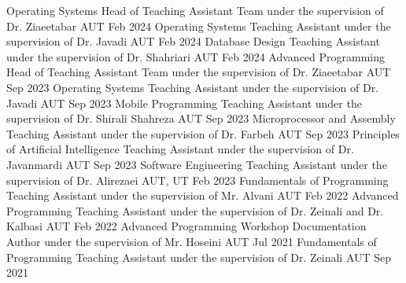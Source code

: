 \documentclass[]{awesome-cv}
\begin{document}
\begin{cvhonors}
        \cvhonor
	{Operating Systems}
	{Head of Teaching Assistant Team under the supervision of Dr. Ziaeetabar}
	{AUT}
	{Feb 2024}
         \cvhonor
	{Operating Systems}
	{Teaching Assistant under the supervision of Dr. Javadi}
	{AUT}
	{Feb 2024}
         \cvhonor
	{Database Design}
	{Teaching Assistant under the supervision of Dr. Shahriari}
	{AUT}
	{Feb 2024}
	\cvhonor
	{Advanced Programming}
	{Head of Teaching Assistant Team under the supervision of Dr. Ziaeetabar}
	{AUT}
	{Sep 2023}
	\cvhonor
	{Operating Systems}
	{Teaching Assistant under the supervision of Dr. Javadi}
	{AUT}
	{Sep 2023}
	\cvhonor
	{Mobile Programming}
	{Teaching Assistant under the supervision of Dr. Shirali Shahreza}
	{AUT}
	{Sep 2023}
	\cvhonor
	{Microprocessor and Assembly}
	{Teaching Assistant under the supervision of Dr. Farbeh}
	{AUT}
	{Sep 2023}
	\cvhonor
	{Principles of Artificial Intelligence}
	{Teaching Assistant under the supervision of Dr. Javanmardi}
	{AUT}
	{Sep 2023}
	\cvhonor
	{Software Engineering}
	{Teaching Assistant under the supervision of Dr. Alirezaei}
	{AUT, UT}
	{Feb 2023}
	\cvhonor
	{Fundamentals of Programming}
	{Teaching Assistant under the supervision of Mr. Alvani}
	{AUT}
	{Feb 2022}
	\cvhonor
	{Advanced Programming}
	{Teaching Assistant under the supervision of Dr. Zeinali and Dr. Kalbasi}
	{AUT}
	{Feb 2022}
	\cvhonor
	{Advanced Programming}
	{Workshop Documentation Author under the supervision of Mr. Hoseini}
	{AUT}
	{Jul 2021}
	\cvhonor
	{Fundamentals of Programming}
	{Teaching Assistant under the supervision of Dr. Zeinali}
	{AUT}
	{Sep 2021}
\end{cvhonors}
\end{document}
